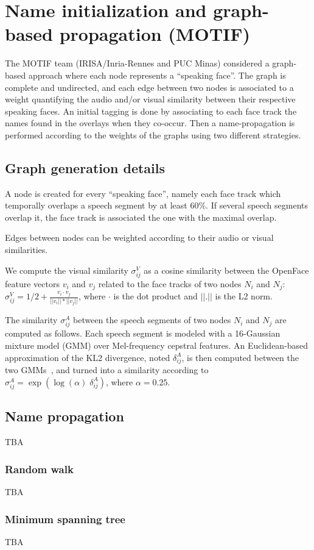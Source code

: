 \section{Name initialization and graph-based propagation (MOTIF)}
\label{sec:graph}

The MOTIF team (IRISA/Inria-Rennes and PUC Minas) considered a graph-based approach where each node represents a ``speaking face''. The graph is complete and undirected, and each edge between two nodes is associated to a weight quantifying the audio and/or visual similarity between their respective speaking faces. An initial tagging is done by associating to each face track the names found in the overlays when they co-occur. Then a name-propagation is performed according to the weights of the graphs using two different strategies.

\subsection{Graph generation details}
\label{ssec:graph_gen}
A node is created for every ``speaking face'', namely each face track which temporally overlaps a speech segment by at least 60\%. If several speech segments overlap it, the face track is associated the one with the maximal overlap.

Edges between nodes can be weighted according to their audio or visual similarities. 

We compute the visual similarity $\sigma^V_{ij}$ as a cosine similarity between the OpenFace feature vectors $v_i$ and $v_j$ related to the face tracks of two nodes $N_i$ and $N_j$: $\sigma^V_{ij}=1/2+\frac{v_i\cdot v_j}{||v_i||*||v_j||}$, where $\cdot$ is the dot product and $||.||$ is the L2 norm.

The similarity $\sigma^A_{ij}$ between the speech segments of two nodes  $N_i$ and $N_j$ are computed as follows. Each speech segment is modeled with a 16-Gaussian mixture model (GMM) over Mel-frequency cepstral features. An Euclidean-based approximation of the KL2 divergence, noted $\delta^A_{ij}$, is then computed between the two GMMs~\cite{Ben}, and turned into a
similarity according to $\sigma^A_{ij}=\exp(\log{(\alpha)} \; \delta^A_{ij})$, where $\alpha = 0.25$.


\subsection{Name propagation}

TBA

\subsubsection{Random walk}

TBA

\subsubsection{Minimum spanning tree}

TBA

\endinput
